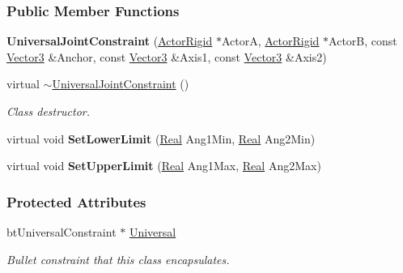\subsubsection*{Public Member Functions}
\begin{DoxyCompactItemize}
\item 
\hypertarget{classMezzanine_1_1UniversalJointConstraint_a6f32c739e1325b12c5e6b1b943f9873e}{
{\bfseries UniversalJointConstraint} (\hyperlink{classMezzanine_1_1ActorRigid}{ActorRigid} $\ast$ActorA, \hyperlink{classMezzanine_1_1ActorRigid}{ActorRigid} $\ast$ActorB, const \hyperlink{classMezzanine_1_1Vector3}{Vector3} \&Anchor, const \hyperlink{classMezzanine_1_1Vector3}{Vector3} \&Axis1, const \hyperlink{classMezzanine_1_1Vector3}{Vector3} \&Axis2)}
\label{classMezzanine_1_1UniversalJointConstraint_a6f32c739e1325b12c5e6b1b943f9873e}

\item 
virtual \hyperlink{classMezzanine_1_1UniversalJointConstraint_a2e6d0ee965247873976fa16f2e425feb}{$\sim$UniversalJointConstraint} ()
\begin{DoxyCompactList}\small\item\em Class destructor. \item\end{DoxyCompactList}\item 
\hypertarget{classMezzanine_1_1UniversalJointConstraint_a297c78051c93fbcbaf0d24a9030a4306}{
virtual void {\bfseries SetLowerLimit} (\hyperlink{namespaceMezzanine_a726731b1a7df72bf3583e4a97282c6f6}{Real} Ang1Min, \hyperlink{namespaceMezzanine_a726731b1a7df72bf3583e4a97282c6f6}{Real} Ang2Min)}
\label{classMezzanine_1_1UniversalJointConstraint_a297c78051c93fbcbaf0d24a9030a4306}

\item 
\hypertarget{classMezzanine_1_1UniversalJointConstraint_aa5d0ac22ca65ba13e82d827f89283ba6}{
virtual void {\bfseries SetUpperLimit} (\hyperlink{namespaceMezzanine_a726731b1a7df72bf3583e4a97282c6f6}{Real} Ang1Max, \hyperlink{namespaceMezzanine_a726731b1a7df72bf3583e4a97282c6f6}{Real} Ang2Max)}
\label{classMezzanine_1_1UniversalJointConstraint_aa5d0ac22ca65ba13e82d827f89283ba6}

\end{DoxyCompactItemize}
\subsubsection*{Protected Attributes}
\begin{DoxyCompactItemize}
\item 
\hypertarget{classMezzanine_1_1UniversalJointConstraint_a30a26e23a0ff9b01212818ee9bc3a0c7}{
btUniversalConstraint $\ast$ \hyperlink{classMezzanine_1_1UniversalJointConstraint_a30a26e23a0ff9b01212818ee9bc3a0c7}{Universal}}
\label{classMezzanine_1_1UniversalJointConstraint_a30a26e23a0ff9b01212818ee9bc3a0c7}

\begin{DoxyCompactList}\small\item\em Bullet constraint that this class encapsulates. \item\end{DoxyCompactList}\end{DoxyCompactItemize}


